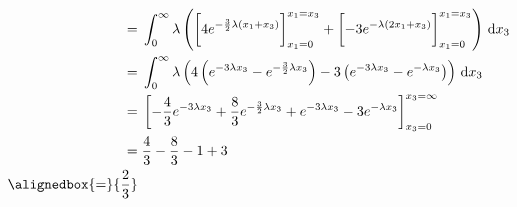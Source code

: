 \documentclass[hwnumber=3,studentnumber=20053722]{mthe353answer}
\begin{document}
\begin{questions}
\begin{parts}
\begin{solution}
\begin{align*}
          =&\; \int_0^\infty \lambda\left(\biggl[4e^{-\frac{3}{2}\lambda(x_1+x_3)}\biggr]_{x_1=0}^{x_1=x_3}
            + \biggl[-3e^{-\lambda(2x_1+x_3)}\biggr]_{x_1=0}^{x_1=x_3}\right)
            \, \textrm{d}x_3\\
          =&\; \int_0^\infty \lambda\left(4\left(e^{-3\lambda x_3} - e^{-\frac{3}{2}\lambda x_3}\right)
            - 3\left(e^{-3\lambda x_3} - e^{-\lambda x_3}\right)\right)
            \, \textrm{d}x_3\\
          =&\; \left[-\frac{4}{3}e^{-3\lambda x_3} + \frac{8}{3}e^{-\frac{3}{2}\lambda x_3}
            + e^{-3\lambda x_3} -3e^{-\lambda x_3}\right]_{x_3=0}^{x_3=\infty}\\
          =&\; \frac{4}{3} - \frac{8}{3} - 1 + 3\\
          \alignedbox{=}{\frac{2}{3}}
        \end{align*}
      \end{solution}
    \end{parts}
  \end{questions}
\end{document}
